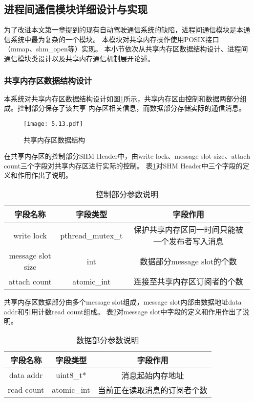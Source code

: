 \subsection{进程间通信模块详细设计与实现}
为了改进本文第一章提到的现有自动驾驶通信系统的缺陷，进程间通信模块是本通信系统中最为复杂的一个模块。
本模块对共享内存操作使用POSIX接口（mmap、shm\_open等）实现。
本小节依次从共享内存区数据结构设计、进程间通信模块类设计以及共享内存通信机制展开论述。

\subsubsection{共享内存区数据结构设计}
本系统对共享内存区数据结构设计如图\ref{shm_data_structure}所示，共享内存区由控制和数据两部分组成。控制部分保存了该共享
内存区相关信息，而数据部分存储实际的通信消息。
\begin{figure}[H]
  \centering
  \texttt{[image: 5.13.pdf]}
  \caption{共享内存区数据结构}
  \label{shm_data_structure}
\end{figure}

在共享内存区的控制部分SHM Header中，由write lock、message slot size、attach count三个字段对共享内存区进行实际的控制。
表\ref{shm_control_part}对SHM Header中三个字段的定义和作用作出了说明。
\begin{table}[htb]
  \centering\small
  \caption{控制部分参数说明}
  \label{shm_control_part}
  \begin{tabular}{ccc}
    \toprule
    字段名称 & 字段类型 & 字段作用\\
    \midrule
    write lock & pthread\_mutex\_t & 保护共享内存区同一时间只能被一个发布者写入消息\\
    message slot size & int & 数据部分message slot的个数\\
    attach count & atomic\_int & 连接至共享内存区订阅者的个数\\
    \bottomrule
  \end{tabular}
\end{table}

共享内存区数据部分由多个message slot组成，message slot内部由数据地址data addr和引用计数read count组成。
表\ref{shm_data_part}对message slot中字段的定义和作用作出了说明。
\begin{table}[htb]
  \centering\small
  \caption{数据部分参数说明}
  \label{shm_data_part}
  \begin{tabular}{ccc}
    \toprule
    字段名称 & 字段类型 & 字段作用\\
    \midrule
    data addr & uint8\_t*& 消息起始内存地址\\
    read count & atomic\_int & 当前正在读取消息的订阅者个数\\
    \bottomrule
  \end{tabular}
\end{table}


